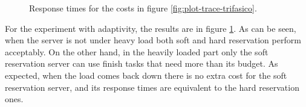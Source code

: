 \documentclass[times, 10pt,twocolumn]{article}
\begin{document}
\begin{figure}[t]
  \centering
  \caption{Response times for the costs in figure
    \ref{fig:plot-trace-trifasico}.}
  \label{fig:trifasico}
\end{figure}

For the experiment with adaptivity, the results are in figure
\ref{fig:trifasico}. As can be seen, when the server is not under
heavy load both soft and hard reservation perform acceptably. On the
other hand, in the heavily loaded part only the soft reservation
server can use finish tasks that need more than its budget. As
expected, when the load comes back down there is no extra cost for the
soft reservation server, and its response times are equivalent to the
hard reservation ones.
\end{document}
